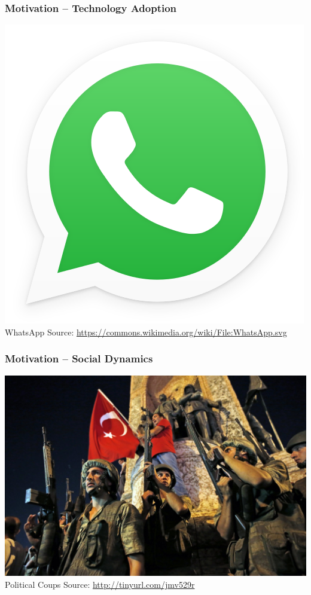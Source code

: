\documentclass[slidestop,usenames,dvipsnames]{beamer}
\begin{document}
\begin{frame}
    \frametitle{Motivation -- Technology Adoption}
    \begin{center}
        \includegraphics[height=0.65\textheight]{img/whatsapp}
        \vfill\vspace{8pt}
        {\huge WhatsApp}
        \vfill\vspace{8pt}
        {\small Source: \url{https://commons.wikimedia.org/wiki/File:WhatsApp.svg}}
    \end{center}
    \vfill
\end{frame}

\begin{frame}
    \frametitle{Motivation -- Social Dynamics}
    \begin{center}
        \includegraphics[height=0.65\textheight]{img/coup}
        \vfill\vspace{8pt}
        {\huge Political Coups}
        \vfill\vspace{8pt}
        {\small Source: \url{http://tinyurl.com/jmv529r}}
    \end{center}
    \vfill
\end{frame}
\end{document}
